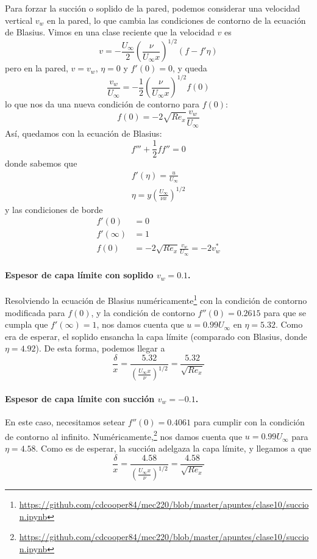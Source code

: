 Para forzar la succión o soplido de la pared, podemos considerar una velocidad vertical $v_w$ en la pared, lo que cambia las condiciones de contorno de la ecuación de Blasius. Vimos en una clase reciente que la velocidad $v$ es
%
\begin{equation}
v = -\frac{U_\infty}{2}\left(\frac{\nu}{U_\infty x}\right)^{1/2}(f-f'\eta)
\end{equation}
%
pero en la pared, $v=v_w$, $\eta=0$ y $f'(0)=0$, y queda
%
\begin{equation}
\frac{v_w}{U_\infty} = -\frac{1}{2}\left(\frac{\nu}{U_\infty x}\right)^{1/2}f(0)
\end{equation}
%
lo que nos da una nueva condición de contorno para $f(0)$:
%
\begin{equation}
f(0) = -2\sqrt{Re_x}\frac{v_w}{U_\infty}
\end{equation}
%
Así, quedamos con la ecuación de Blasius:
%
\begin{equation}
f'''+\frac{1}{2}ff''=0
\end{equation}
%
donde sabemos que
%
\begin{align}
f'(\eta) = \frac{u}{U_\infty}\\
\eta = y\left(\frac{U_\infty}{\nu x}\right)^{1/2}
\end{align}
%
y las condiciones de borde
%
\begin{align}
f'(0) &= 0\\
f'(\infty) &= 1\\
f(0) &= -2\sqrt{Re_x}\frac{v_w}{U_\infty}=-2v_w^*
\end{align}

\paragraph*{Espesor de capa límite con soplido $v_w=0.1$.}
Resolviendo la ecuación de Blasius numéricamente\footnote{\url{https://github.com/cdcooper84/mec220/blob/master/apuntes/clase10/succion.ipynb}} con la condición de contorno modificada para $f(0)$, y la condición de contorno $f''(0)=0.2615$ para que se cumpla que $f'(\infty)=1$, nos damos cuenta que $u=0.99U_\infty$ en $\eta=5.32$. 
Como era de esperar, el soplido ensancha la capa límite (comparado con Blasius, donde $\eta=4.92$). De esta forma, podemos llegar a 
%
\begin{equation}
\frac{\delta}{x}=\frac{5.32}{\left(\frac{U_\infty x}{\nu}\right)^{1/2}} = \frac{5.32}{\sqrt{Re_x}} 
\end{equation}

\paragraph*{Espesor de capa límite con succión $v_w=-0.1$.}
En este caso, necesitamos setear $f''(0) = 0.4061$ para cumplir con la condición de contorno al infinito.
Numéricamente,\footnote{\url{https://github.com/cdcooper84/mec220/blob/master/apuntes/clase10/succion.ipynb}} nos damos cuenta que $u=0.99U_\infty$ para $\eta=4.58$. Como es de esperar, la succión adelgaza la capa límite, y llegamos a que
%
\begin{equation}
\frac{\delta}{x}=\frac{4.58}{\left(\frac{U_\infty x}{\nu}\right)^{1/2}} = \frac{4.58}{\sqrt{Re_x}} 
\end{equation}

